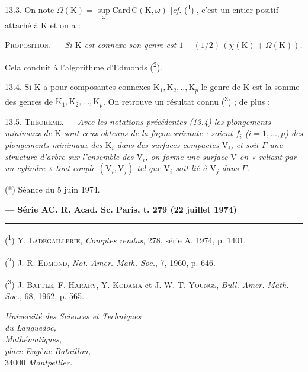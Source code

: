 13.3. On note \(\Omega(\mathrm{K})=\sup\limits_\omega\mathrm{Card}\,\mathrm{C}(\mathrm{K},\omega)\) [\textit{cf.} (\textsuperscript{1})], c'est un entier positif attaché à \(\mathrm{K}\) et on a :

\textsc{Proposition.} --- \textit{Si \(\mathrm{K}\) est connexe son genre est \(1-(1/2)\,(\chi(\mathrm{K})+\Omega(\mathrm{K}))\).}

Cela conduit à l'algorithme d'Edmonds (\textsuperscript{2}).

13.4. Si \(\mathrm{K}\) a pour composantes connexes \(\mathrm{K}_1,\mathrm{K}_2,..,\mathrm{K}_p\) le genre de \(\mathrm{K}\) est la somme des genres de \(\mathrm{K}_1,\mathrm{K}_2,\ldots,\mathrm{K}_p\). On retrouve un résultat connu (\textsuperscript{3}) ; de plus :

13.5. \textsc{Théorème.} --- \textit{Avec les notations précédentes \textup{(13.4)} les plongements minimaux de \(\mathrm{K}\) sont ceux obtenus de la façon suivante : soient \(f_i\) (\(i=1,\ldots,p\)) des plongements minimaux des \(\mathrm{K}_i\) dans des surfaces compactes \(\mathrm{V}_i\), et soit \(\Gamma\) une structure d'arbre sur l'ensemble des \(\mathrm{V}_i\), on forme une surface \(\mathrm{V}\) en « reliant par un cylindre » tout couple \((\mathrm{V}_i,\mathrm{V}_j)\) tel que \(\mathrm{V}_i\) soit lié à \(\mathrm{V}_j\) dans \(\Gamma\).}

{\small (*) Séance du 5 juin 1974.}

\textbf{--- Série A}\hfill\textbf{C. R. Acad. Sc. Paris, t. 279 (22 juillet 1974)}\par\noindent\rule{\linewidth}{.35pt}\par

{\small (\textsuperscript{1}) Y. \textsc{Ladegaillerie}, \textit{Comptes rendus}, 278, série A, 1974, p. 1401.

(\textsuperscript{2}) J. R. \textsc{Edmond}, \textit{Not. Amer. Math. Soc.}, 7, 1960, p. 646.

(\textsuperscript{3}) J. \textsc{Battle}, F. \textsc{Harary}, Y. \textsc{Kodama} et J. W. T. \textsc{Youngs}, \textit{Bull. Amer. Math. Soc.}, 68, 1962, p. 565.}

\begin{flushright}
\textit{Université des Sciences et Techniques}\\
\textit{du Languedoc,}\\
\textit{Mathématiques,}\\
\textit{place Eugène-Bataillon,}\\
34000 \textit{Montpellier.}
\end{flushright}

